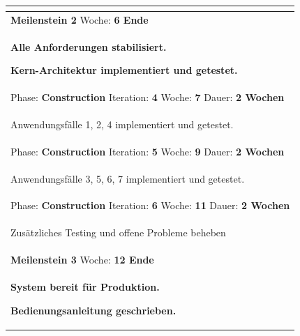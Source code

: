 \documentclass[11pt,ngerman]{article}
\begin{document}
\begin{tabularx}{\textwidth}{X}
\begin{compactitem}
    	\end{compactitem}\\
    	\toprule
    	\rowcolor{lightgray}
    	\textbf{Meilenstein 2} Woche: \textbf{6 Ende}\\
    	\rowcolor{lightgray}
    	\begin{compactitem}
    		\item \textbf{Alle Anforderungen stabilisiert.}
    		\item \textbf{Kern-Architektur implementiert und getestet.}
    	\end{compactitem}\\
    	\toprule
    	Phase: \textbf{Construction} Iteration: \textbf{4} Woche: \textbf{7} Dauer: \textbf{2 Wochen}\\
    	\begin{compactitem}
    		\item Anwendungsfälle 1, 2, 4 implementiert und getestet.
    	\end{compactitem}\\
    	\toprule
    	Phase: \textbf{Construction} Iteration: \textbf{5} Woche: \textbf{9} Dauer: \textbf{2 Wochen}\\
    	\begin{compactitem}
    		\item Anwendungsfälle 3, 5, 6, 7 implementiert und getestet.
    	\end{compactitem}\\
    	\toprule
    	Phase: \textbf{Construction} Iteration: \textbf{6} Woche: \textbf{11} Dauer: \textbf{2 Wochen}\\
    	\begin{compactitem}
    		\item Zusätzliches Testing und offene Probleme beheben
    	\end{compactitem}\\
    	\toprule
    	\rowcolor{lightgray}
    	\textbf{Meilenstein 3} Woche: \textbf{12 Ende}\\
    	\rowcolor{lightgray}
    	\begin{compactitem}
    		\item \textbf{System bereit für Produktion.}
    		\item \textbf{Bedienungsanleitung geschrieben.}
    	\end{compactitem}\\
    	\bottomrule
    \end{tabularx}
\end{document}
